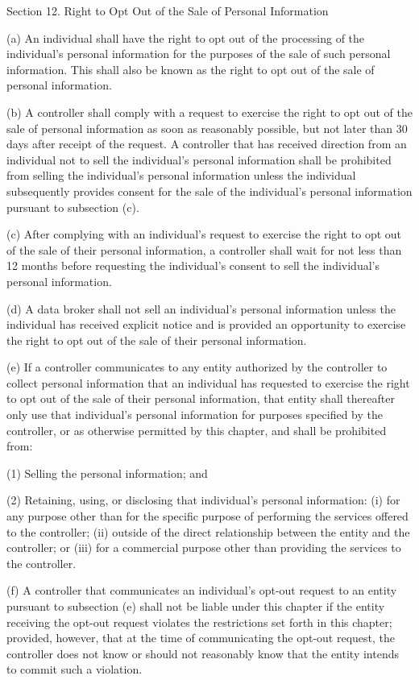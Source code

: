 Section 12. Right to Opt Out of the Sale of Personal Information 

(a) An individual shall have the right to opt out of the processing of the individual’s personal information for the purposes of the sale of such personal information. This shall also be known as the right to opt out of the sale of personal information. 

(b) A controller shall comply with a request to exercise the right to opt out of the sale of personal information as soon as reasonably possible, but not later than 30 days after receipt of the request. A controller that has received direction from an individual not to sell the individual’s personal information shall be prohibited from selling the individual’s personal information unless the individual subsequently provides consent for the sale of the individual’s personal information pursuant to subsection (c).

(c) After complying with an individual’s request to exercise the right to opt out of the sale of their personal information, a controller shall wait for not less than 12 months before requesting the individual’s consent to sell the individual’s personal information.

(d) A data broker shall not sell an individual’s personal information unless the individual has received explicit notice and is provided an opportunity to exercise the right to opt out of the sale of their personal information.

(e) If a controller communicates to any entity authorized by the controller to collect personal information that an individual has requested to exercise the right to opt out of the sale of their personal information, that entity shall thereafter only use that individual’s personal information for purposes specified by the controller, or as otherwise permitted by this chapter, and shall be prohibited from:

(1) Selling the personal information; and

(2) Retaining, using, or disclosing that individual’s personal information: (i) for any purpose other than for the specific purpose of performing the services offered to the controller; (ii) outside of the direct relationship between the entity and the controller; or (iii) for a commercial purpose other than providing the services to the controller.

(f) A controller that communicates an individual’s opt-out request to an entity pursuant to subsection (e) shall not be liable under this chapter if the entity receiving the opt-out request violates the restrictions set forth in this chapter; provided, however, that at the time of communicating the opt-out request, the controller does not know or should not reasonably know that the entity intends to commit such a violation.

